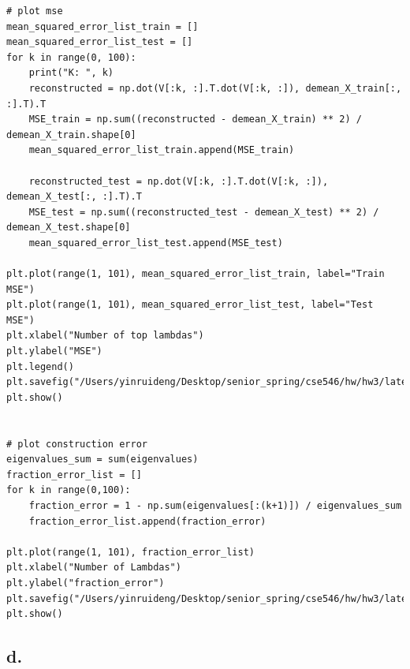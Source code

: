 \documentclass{article}
\begin{document}
\begin{verbatim}
# plot mse
mean_squared_error_list_train = []
mean_squared_error_list_test = []
for k in range(0, 100):
	print("K: ", k)
	reconstructed = np.dot(V[:k, :].T.dot(V[:k, :]), demean_X_train[:, :].T).T
	MSE_train = np.sum((reconstructed - demean_X_train) ** 2) / demean_X_train.shape[0]
	mean_squared_error_list_train.append(MSE_train)
	
	reconstructed_test = np.dot(V[:k, :].T.dot(V[:k, :]), demean_X_test[:, :].T).T
	MSE_test = np.sum((reconstructed_test - demean_X_test) ** 2) / demean_X_test.shape[0]
	mean_squared_error_list_test.append(MSE_test)

plt.plot(range(1, 101), mean_squared_error_list_train, label="Train MSE")
plt.plot(range(1, 101), mean_squared_error_list_test, label="Test MSE")
plt.xlabel("Number of top lambdas")
plt.ylabel("MSE")
plt.legend()
plt.savefig("/Users/yinruideng/Desktop/senior_spring/cse546/hw/hw3/latex/plots/A6c_1.png")
plt.show()


# plot construction error
eigenvalues_sum = sum(eigenvalues)
fraction_error_list = []
for k in range(0,100):
	fraction_error = 1 - np.sum(eigenvalues[:(k+1)]) / eigenvalues_sum
	fraction_error_list.append(fraction_error)

plt.plot(range(1, 101), fraction_error_list)
plt.xlabel("Number of Lambdas")
plt.ylabel("fraction_error")
plt.savefig("/Users/yinruideng/Desktop/senior_spring/cse546/hw/hw3/latex/plots/A6c_2.png")
plt.show()
\end{verbatim}

\subsection*{d.}
\end{document}
